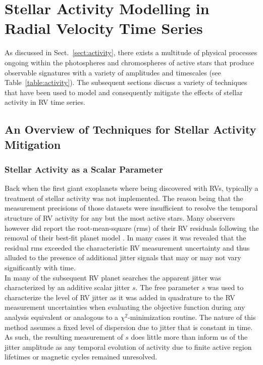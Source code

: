\chapter{Stellar Activity Modelling in Radial Velocity Time Series}
As discussed in Sect.~\ref{sect:activity}, there exists a multitude of physical
processes ongoing within the photospheres and chromospheres of active stars
that produce observable signatures with a variety of amplitudes and timescales
(see Table~\ref{table:activity}). The subsequent sections discuss a variety of
techniques that have been used to model and consequently mitigate the effects of
stellar activity in RV time series.

\section{An Overview of Techniques for Stellar Activity Mitigation}
\label{sect:methods}

\subsection{Stellar Activity as a Scalar Parameter}
Back when the first giant exoplanets where being discovered with RVs,
typically a treatment of stellar activity was not implemented. The reason being
that the measurement precisions of those datasets were insufficient to resolve the
temporal structure of RV activity for any but the most active stars. Many
observers however did report the root-mean-square (rms) of their RV residuals
following the removal of their best-fit planet model
\citep[e.g.][]{mayor95,butler96}. In
many cases it was revealed that the residual rms exceeded the characteristic RV
measurement uncertainty and thus alluded to the presence of additional
jitter signals that may or may not vary significantly with time. \\

In many of the subsequent RV planet searches the apparent jitter was characterized
by an additive scalar jitter $s$. The free parameter $s$ was used to characterize the
level of RV jitter as it was added in quadrature to the RV measurement
uncertainties when evaluating the objective function during any analysis
equivalent or analogous to a $\chi^2$-minimization routine. The nature of this
method assumes a fixed level of dispersion due to jitter that is constant in time.
As such, the resulting
measurement of $s$ does little more than inform us of the jitter amplitude as
any temporal evolution of activity due to finite active region lifetimes or magnetic
cycles remained unresolved.

